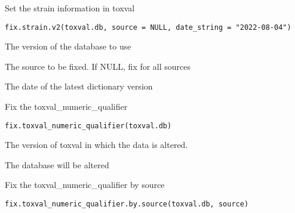 \documentclass[letterpaper]{book}
\begin{document}
%
\begin{Description}\relax
Set the strain information in toxval
\end{Description}
%
\begin{Usage}
\begin{verbatim}
fix.strain.v2(toxval.db, source = NULL, date_string = "2022-08-04")
\end{verbatim}
\end{Usage}
%
\begin{Arguments}
\begin{ldescription}
\item[\code{toxval.db}] The version of the database to use

\item[\code{source}] The source to be fixed. If NULL, fix for all sources

\item[\code{date\_string}] The date of the latest dictionary version
\end{ldescription}
\end{Arguments}
%
\begin{Description}\relax
Fix the toxval\_numeric\_qualifier
\end{Description}
%
\begin{Usage}
\begin{verbatim}
fix.toxval_numeric_qualifier(toxval.db)
\end{verbatim}
\end{Usage}
%
\begin{Arguments}
\begin{ldescription}
\item[\code{toxval.db}] The version of toxval in which the data is altered.
\end{ldescription}
\end{Arguments}
%
\begin{Value}
The database will be altered
\end{Value}
%
\begin{Description}\relax
Fix the toxval\_numeric\_qualifier by source
\end{Description}
%
\begin{Usage}
\begin{verbatim}
fix.toxval_numeric_qualifier.by.source(toxval.db, source)
\end{verbatim}
\end{Usage}
\end{document}
